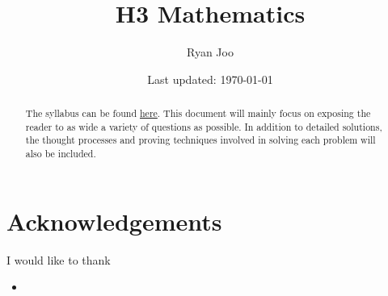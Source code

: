 \documentclass[12pt,a4 paper]{article}
\title{H3 Mathematics}
\author{Ryan Joo}
\date{Last updated: \today}
\begin{document}
\maketitle
\begin{abstract}
The syllabus can be found \href{https://www.seab.gov.sg/docs/default-source/national-examinations/syllabus/alevel/2024syllabus/9820_y24_sy.pdf}{here}. This document will mainly focus on exposing the reader to as wide a variety of questions as possible. In addition to detailed solutions, the thought processes and proving techniques involved in solving each problem will also be included.
\end{abstract}
\pagebreak

\section*{Acknowledgements}
I would like to thank
\begin{itemize}
\item 
\end{itemize}
\end{document}
